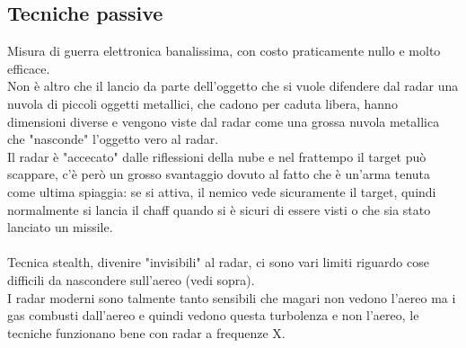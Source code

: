 \documentclass[oneside, 12pt]{extbook}
\begin{document}
\subsection{Tecniche passive}
Misura di guerra elettronica banalissima, con costo praticamente nullo e molto efficace.\\
Non è altro che il lancio da parte dell'oggetto che si vuole difendere dal radar una nuvola di piccoli oggetti metallici, che cadono per caduta libera, hanno dimensioni diverse e vengono viste dal radar come una grossa nuvola metallica che "nasconde" l'oggetto vero al radar.\\
Il radar è "accecato" dalle riflessioni della nube e nel frattempo il target può scappare, c'è però un grosso svantaggio dovuto al fatto che è un'arma tenuta come ultima spiaggia: se si attiva, il nemico vede sicuramente il target, quindi normalmente si lancia il chaff quando si è sicuri di essere visti o che sia stato lanciato un missile.\\\\
Tecnica stealth, divenire "invisibili" al radar, ci sono vari limiti riguardo cose difficili da nascondere sull'aereo (vedi sopra).\\
I radar moderni sono talmente tanto sensibili che magari non vedono l'aereo ma i gas combusti dall'aereo e quindi vedono questa turbolenza e non l'aereo, le tecniche funzionano bene con radar a frequenze X.
\end{document}
